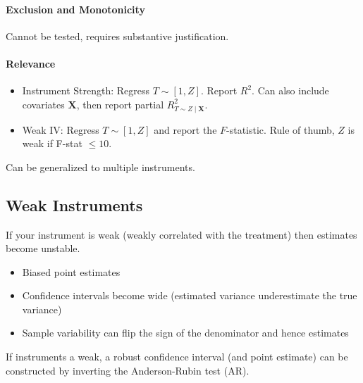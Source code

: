 \documentclass[11pt]{exam}
\theoremstyle{plain}
\newcommand{\bX}{\bm{X}}
\begin{document}
\paragraph{Exclusion and Monotonicity}

Cannot be tested, requires substantive justification.

\paragraph{Relevance}
\begin{itemize}
    \item Instrument Strength: Regress $T \sim [1, Z]$. Report $R^2$. Can also include covariates $\bX$, then report partial $R_{T \sim Z\mid \bX}^2$.
    \item Weak IV: Regress $T \sim [1, Z]$ and report the $F$-statistic. Rule of thumb, $Z$ is weak if F-stat $\leq 10$.
\end{itemize}

Can be generalized to multiple instruments.

\subsection{Weak Instruments}
If your instrument is weak (weakly correlated with the treatment) then estimates become unstable.
\begin{itemize}
    \item Biased point estimates
    \item Confidence intervals become wide (estimated variance underestimate the true variance)
    \item Sample variability can flip the sign of the denominator and hence estimates
\end{itemize}

If instruments a weak, a robust confidence interval (and point estimate) can be constructed by inverting the Anderson-Rubin test (AR).



\endgroup
\end{document}
